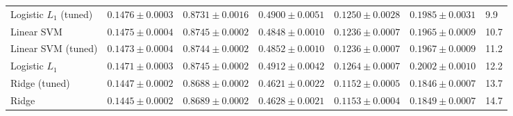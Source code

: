 \begin{table}[htbp]
{\begin{tabular*}{\tblwidth}{@{}LLLLLLL@{}}
Logistic $L_1$ (tuned) & $0.1476 \pm 0.0003$ & $0.8731 \pm 0.0016$ & $0.4900 \pm 0.0051$ & $0.1250 \pm 0.0028$ & $0.1985 \pm 0.0031$ & 9.9 \\
Linear SVM & $0.1475 \pm 0.0004$ & $0.8745 \pm 0.0002$ & $0.4848 \pm 0.0010$ & $0.1236 \pm 0.0007$ & $0.1965 \pm 0.0009$ & 10.7 \\
Linear SVM (tuned) & $0.1473 \pm 0.0004$ & $0.8744 \pm 0.0002$ & $0.4852 \pm 0.0010$ & $0.1236 \pm 0.0007$ & $0.1967 \pm 0.0009$ & 11.2 \\
Logistic $L_1$ & $0.1471 \pm 0.0003$ & $0.8745 \pm 0.0002$ & $0.4912 \pm 0.0042$ & $\mathbf{0.1264 \pm 0.0007}$ & $\mathbf{0.2002 \pm 0.0010}$ & 12.2 \\
Ridge (tuned) & $0.1447 \pm 0.0002$ & $0.8688 \pm 0.0002$ & $0.4621 \pm 0.0022$ & $0.1152 \pm 0.0005$ & $0.1846 \pm 0.0007$ & 13.7 \\
Ridge & $0.1445 \pm 0.0002$ & $0.8689 \pm 0.0002$ & $0.4628 \pm 0.0021$ & $0.1153 \pm 0.0004$ & $0.1849 \pm 0.0007$ & 14.7 \\
\bottomrule
\end{tabular*}%
}
\end{table}

\begin{table}[htbp]
\centering
\caption{Learning curve in PR-AUC (mean $\pm$ 95\% CI over 10 repetitions). For each training size: both TabPFN versions, the best classical model in each variant, and the paired comparison of each TabPFN version with tuned XGBoost: number of repetitions in which TabPFN obtained the higher PR-AUC and, in parentheses, the Holm-adjusted $p$-value of the two-sided Wilcoxon signed-rank test (Section~\ref{sec:stats}).}
\label{tab:learning}
\footnotesize
{}
\end{table}

